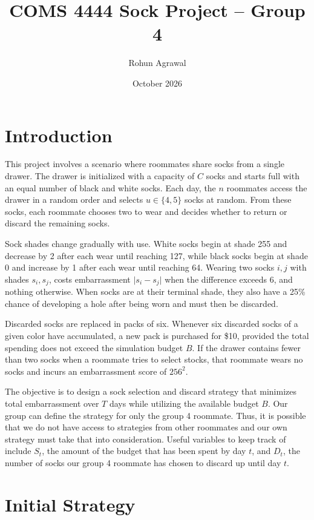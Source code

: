 \documentclass[11pt]{article}
\title{COMS 4444 Sock Project -- Group 4}
\author{Rohun Agrawal}
\date{October 2026}
\begin{document}
\maketitle

\section{Introduction}

This project involves a scenario where roommates share socks from a single drawer. The drawer is initialized with a capacity of $C$ socks and starts full with an equal number of black and white socks. Each day, the $n$ roommates access the drawer in a random order and selects \(u \in \{4,5\}\) socks at random. From these socks, each roommate chooses two to wear and decides whether to return or discard the remaining socks.

Sock shades change gradually with use. White socks begin at shade 255 and decrease by 2 after each wear until reaching 127, while black socks begin at shade 0 and increase by 1 after each wear until reaching 64. Wearing two socks $i, j$ with shades $s_i, s_j$, costs embarrassment \(\lvert s_i-s_j\rvert\) when the difference exceeds 6, and nothing otherwise. When socks are at their terminal shade, they also have a 25\% chance of developing a hole after being worn and must then be discarded.

Discarded socks are replaced in packs of six. Whenever six discarded socks of a given color have accumulated, a new pack is purchased for \$10, provided the total spending does not exceed the simulation budget $B$. If the drawer contains fewer than two socks when a roommate tries to select stocks, that roommate wears no socks and incurs an embarrassment score of $256^2$.

The objective is to design a sock selection and discard strategy that minimizes total embarrassment over $T$ days while utilizing the available budget $B$. Our group can define the strategy for only the group 4 roommate. Thus, it is possible that we do not have access to strategies from other roommates and our own strategy must take that into consideration. Useful variables to keep track of include $S_t$, the amount of the budget that has been spent by day $t$, and $D_t$, the number of socks our group 4 roommate has chosen to discard up until day $t$.

\section{Initial Strategy}
\end{document}
